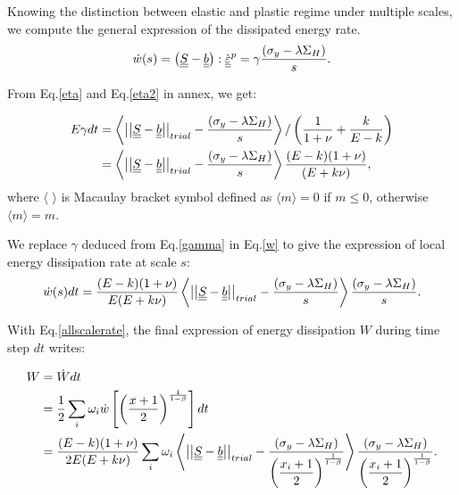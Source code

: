 Knowing the distinction between elastic and plastic regime under multiple scales, we compute the general expression of the dissipated energy rate.
\begin{equation}
\dot{w}(s)=\left( \uline{\uline{S}}-\uline{\uline{b}}\right) :\dot{\uline{\uline{\varepsilon}}}^p=\gamma\dfrac{  \left(\sigma_y-\lambda \Sigma_H\right)}{s}.
\label{w}
\end{equation}

From Eq.\eqref{eta} and Eq.\eqref{eta2} in annex, we get:

\begin{equation}
	\begin{split}
		E\gamma dt&=\left\langle \left| \left|\uline{\uline{S}}-\uline{\uline{b}}\right| \right|_{trial}-\dfrac{ \left(\sigma_y-\lambda \Sigma_H\right)}{s}\right\rangle /\left(\dfrac{1}{1+\nu}+\dfrac{k}{E-k} \right)
		\\&=\left\langle \left| \left|\uline{\uline{S}}-\uline{\uline{b}}\right| \right|_{trial}-\dfrac{ \left(\sigma_y-\lambda \Sigma_H\right)}{s}\right\rangle\dfrac{(E-k)(1+\nu) }{(E+k\nu)},
	\end{split}
	\label{gamma}
\end{equation}
where $\langle$ $\rangle$ is Macaulay bracket symbol defined as $\langle m\rangle=0$ if $m\leqslant0$, otherwise $\langle m\rangle=m$.

We replace $\gamma$ deduced from Eq.\eqref{gamma} in Eq.\eqref{w} to give the expression of local energy dissipation rate at scale $s$:
\begin{equation}
\dot{w}(s)dt=\dfrac{(E-k)(1+\nu) }{E(E+k\nu)}\left\langle  \left| \left|\uline{\uline{S}}-\uline{\uline{b}}\right| \right|_{trial}-\dfrac{ \left(\sigma_y-\lambda \Sigma_H\right)}{s}\right\rangle \dfrac{ \left(\sigma_y-\lambda \Sigma_H\right)}{s}.
\label{dW}
\end{equation}

With Eq.\eqref{allscalerate}, the final expression of energy dissipation $W$ during time step $dt$ writes:

\begin{equation}
\begin{split}
W&=\dot{W}dt
\\&=\frac{1}{2}\sum_{i}\omega_i\dot{w}\left[  \left( \frac{x+1}{2}\right) ^{\frac{1}{1-\beta}}\right]dt
\\&=\dfrac{(E-k)(1+\nu) }{2E(E+k\nu)}\sum_{i}\omega_i\left\langle  \left| \left|\uline{\uline{S}}-\uline{\uline{b}}\right| \right|_{trial}-\dfrac{\left(\sigma_y-\lambda \Sigma_H\right) }{\left( \dfrac{x_i+1}{2}\right) ^{\frac{1}{1-\beta}}}\right\rangle \dfrac{\left(\sigma_y-\lambda \Sigma_H\right) }{\left( \dfrac{x_i+1}{2}\right)^{\frac{1}{1-\beta}}}.
\end{split}
\label{finaldw}
\end{equation}

